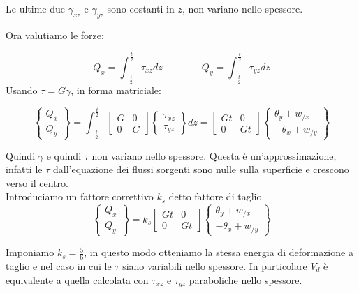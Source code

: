 Le ultime due $\gamma_{xz}$ e $\gamma_{yz}$ sono costanti in $z$, non variano nello spessore.

Ora valutiamo le forze:

\begin{equation*}
    Q_x=\int_{-\frac{t}{2}}^{\frac{t}{2}} \tau_{xz}dz \qquad\qquad  Q_y=\int_{-\frac{t}{2}}^{\frac{t}{2}} \tau_{yz}dz 
\end{equation*}
Usando $\tau=G\gamma$, in forma matriciale:

\begin{equation*}
    \begin{Bmatrix}
        Q_x \\
        Q_y
    \end{Bmatrix}
    =
    \int_{-\frac{t}{2}}^{\frac{t}{2}}
    \left[
\begin{array}{ccc}
\displaystyle G & \displaystyle 0 \\
\displaystyle 0& \displaystyle G 
\end{array}
\right]
    \begin{Bmatrix}
        \tau_{xz} \\
        \tau_{yz}
    \end{Bmatrix}
    dz=
        \left[
\begin{array}{ccc}
\displaystyle Gt & \displaystyle 0 \\
\displaystyle 0& \displaystyle G t
\end{array}
\right]
    \begin{Bmatrix}
        \theta_y+ w_{/x} \\
        -\theta_x+ w_{/y}
    \end{Bmatrix}    
\end{equation*}

Quindi $\gamma$ e quindi $\tau$ non variano nello spessore. Questa è un'approssimazione, infatti le $\tau$ dall'equazione dei flussi sorgenti sono nulle sulla superficie e crescono verso il centro.\\
Introduciamo un fattore correttivo $k_s$ detto fattore di taglio.
\begin{equation*}
    \begin{Bmatrix}
        Q_x \\
        Q_y
    \end{Bmatrix}
   =k_s
        \left[
\begin{array}{ccc}
\displaystyle Gt & \displaystyle 0 \\
\displaystyle 0& \displaystyle G t
\end{array}
\right]
    \begin{Bmatrix}
        \theta_y+ w_{/x} \\
        -\theta_x+ w_{/y}
    \end{Bmatrix}
\end{equation*}

Imponiamo $k_s=\frac{5}{6}$, in questo modo otteniamo la stessa energia di deformazione a taglio e nel caso in cui le $\tau$ siano variabili nello spessore. In particolare $V_d$ è equivalente a quella calcolata con $\tau_{xz}$ e $\tau_{yz}$ paraboliche nello spessore.